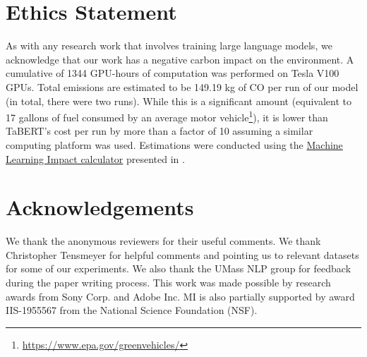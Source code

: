 \documentclass[11pt]{article}
\begin{document}
\section{Ethics Statement}
\label{sec:ethics}
As with any research work that involves training large language models, we acknowledge that our work has a negative carbon impact on the environment. A cumulative of 1344 GPU-hours of computation was performed on Tesla V100 GPUs. Total emissions are estimated to be 149.19 kg of CO per run of our model (in total, there were two runs). While this is a significant amount (equivalent to  17 gallons of fuel consumed by an average motor vehicle\footnote{\url{https://www.epa.gov/greenvehicles/}}), it is lower than TaBERT’s cost per run by more than a factor of 10 assuming a similar computing platform was used.  
Estimations were conducted using the \href{https://mlco2.github.io/impact#compute}{Machine Learning Impact calculator} presented in \citet{lacoste2019quantifying}. \section*{Acknowledgements}
\label{sec:acknowledge}

We thank the anonymous reviewers for their useful comments. We thank Christopher Tensmeyer for helpful comments and pointing us to relevant datasets for some of our experiments. We also thank the UMass NLP group for feedback during the paper writing process. This work was made possible by research awards from Sony Corp. and Adobe Inc. MI is also partially supported by  award IIS-1955567 from the National Science
Foundation (NSF).

 



\end{document}
